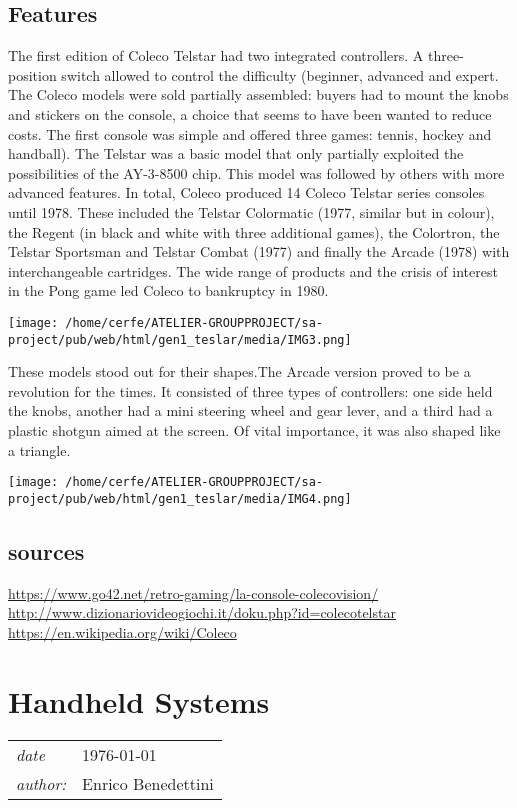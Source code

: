 \documentclass[a4paper,10pt]{book}
\newcommand{\pageHeader}[4]{
    \section{#1}
    \vspace{-0.3cm}
    \begin{table}[h!]
     \begin{tabular}{ll}
        \hline
        \textit{date} & #2 \\
        \textit{author: } & #3\\
        \hline
     \end{tabular}
    \end{table}
    \vspace{-0.3cm}
}
\begin{document}
 \subsection{Features }
 The first edition of Coleco Telstar had two integrated controllers.
          A three-position switch allowed to control the difficulty (beginner, advanced and expert. The Coleco models were sold partially assembled: buyers had to mount the knobs and stickers on the console, a choice that seems to have been wanted to reduce costs. The first console was simple and offered three games: tennis, hockey and handball). The Telstar was a basic model that only partially exploited the possibilities of the AY-3-8500 chip. This model was followed by others with more advanced features. In total, Coleco produced 14 Coleco Telstar series consoles until 1978. These included the Telstar Colormatic (1977, similar but in colour), the Regent (in black and white with three additional games), the Colortron, the Telstar Sportsman and Telstar Combat (1977) and finally the Arcade (1978) with interchangeable cartridges. The wide range of products and the crisis of interest in the Pong game led Coleco to bankruptcy in 1980.
 
 
 \texttt{[image: /home/cerfe/ATELIER-GROUPPROJECT/sa-project/pub/web/html/gen1\_teslar/media/IMG3.png]}
 
      These models stood out for their shapes.The Arcade version proved to be a revolution for the times. It consisted of three types of controllers: one side held the knobs, another had a mini steering wheel and gear lever, and a third had a plastic shotgun aimed at the screen. Of vital importance, it was also shaped like a triangle.

       
 \texttt{[image: /home/cerfe/ATELIER-GROUPPROJECT/sa-project/pub/web/html/gen1\_teslar/media/IMG4.png]}
 
 
 \subsection{sources }
 
 \href{https://www.go42.net/retro-gaming/la-console-colecovision/}{https://www.go42.net/retro-gaming/la-console-colecovision/ }
 \href{http://www.dizionariovideogiochi.it/doku.php?id=coleco_telstar}{http://www.dizionariovideogiochi.it/doku.php?id=colecotelstar }
 \href{https://en.wikipedia.org/wiki/Coleco}{https://en.wikipedia.org/wiki/Coleco }
 
 \newpage\pageHeader{Handheld Systems}{1976-01-01}{Enrico Benedettini}{The first handheld consoles ever.}
\end{document}

